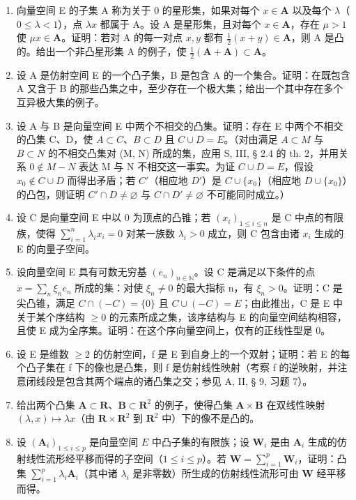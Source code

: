 \exercisegroup

\begin{enumerate}
\def\labelenumi{\arabic{enumi})}
\item
  向量空间 E 的子集 A 称为关于 0 的星形集，如果对每个 \(x \in \mathbf{A}\) 以及每个 \(\lambda\)（\(0 \leqslant \lambda < 1\)），点 \(\lambda x\) 都属于 A。设 A 是星形集，且对每个 \(x \in \mathbf{A}\)，存在 \(\mu > 1\) 使 \(\mu x \in \mathbf{A}\)。证明：若对 A 的每一对点 \(x, y\) 都有 \(\frac{1}{2}(x + y) \in \mathbf{A}\)，则 A 是凸的。给出一个非凸星形集 A 的例子，使 \(\frac{1}{2}(\mathbf{A} + \mathbf{A}) \subset \mathbf{A}\)。
\item
  设 A 是仿射空间 E 的一个凸子集，B 是包含 A 的一个集合。证明：在既包含 A 又含于 B 的那些凸集之中，至少存在一个极大集；给出一个其中存在多个互异极大集的例子。
\item
  设 A 与 B 是向量空间 E 中两个不相交的凸集。证明：存在 E 中两个不相交的凸集 C、D，使 \(A \subset C\)、\(B \subset D\) 且 \(C \cup D = E\)。（对由满足 \(A \subset M\) 与 \(B \subset N\) 的不相交凸集对 (M, N) 所成的集，应用 S, III, § 2.4 的 th. 2，并用关系 \(0 \notin M - N\) 表达 M 与 N 不相交这一事实。为证 \(C \cup D = E\)，假设 \(x_{0} \notin C \cup D\) 而得出矛盾；若 \(C'\)（相应地 \(D'\)）是 \(C \cup \{x_{0}\}\)（相应地 \(D \cup \{x_{0}\}\)）的凸包，则证明 \(C' \cap D \neq \varnothing\) 与 \(C \cap D' \neq \varnothing\) 不可能同时成立。）
\item
  设 C 是向量空间 E 中以 0 为顶点的凸锥；若 \((x_{i})_{1\leqslant i\leqslant n}\) 是 C 中点的有限族，使得 \(\sum_{i = 1}^{n}\lambda_{i}x_{i} = 0\) 对某一族数 \(\lambda_{i} > 0\) 成立，则 C 包含由诸 \(x_{i}\) 生成的 E 的向量子空间。
\item
  设向量空间 E 具有可数无穷基 \((e_{n})_{n\in\mathbb{N}}\)。设 C 是满足以下条件的点 \(x = \sum_{n} \xi_{n} e_{n}\) 所成的集：对使 \(\xi_{n} \neq 0\) 的最大指标 n，有 \(\xi_{n} > 0\)。证明：C 是尖凸锥，满足 \(C \cap (-C) = \{0\}\) 且 \(C \cup (-C) = E\)；由此推出，C 是 E 中关于某个序结构 \(\geqslant 0\) 的元素所成之集，该序结构与 E 的向量空间结构相容，且使 E 成为全序集。证明：在这个序向量空间上，仅有的正线性型是 0。
\item
  设 E 是维数 \(\geqslant 2\) 的仿射空间，f 是 E 到自身上的一个双射；证明：若 E 的每个凸子集在 f 下的像也是凸集，则 f 是仿射线性映射（考察 f 的逆映射，并注意闭线段是包含其两个端点的诸凸集之交；参见 A, II, § 9, 习题 7）。
\item
  给出两个凸集 \(\mathbf{A} \subset \mathbf{R}\)、\(\mathbf{B} \subset \mathbf{R}^2\) 的例子，使得凸集 \(\mathbf{A} \times \mathbf{B}\) 在双线性映射 \((\lambda, x) \mapsto \lambda x\)（由 \(\mathbf{R} \times \mathbf{R}^2\) 到 \(\mathbf{R}^2\) 中）下的像不是凸的。
\item
  设 \((\mathbf{A}_i)_{1 \leqslant i \leqslant p}\) 是向量空间 \(E\) 中凸子集的有限族；设 \(\mathbf{W}_i\) 是由 \(\mathbf{A}_i\) 生成的仿射线性流形经平移而得的子空间（\(1 \leqslant i \leqslant p\)）。若 \(\mathbf{W} = \sum_{i=1}^{p} \mathbf{W}_i\)，证明：凸集 \(\sum_{i=1}^{p} \lambda_i \mathbf{A}_i\)（其中诸 \(\lambda_i\) 是非零数）所生成的仿射线性流形可由 \(\mathbf{W}\) 经平移而得。
\end{enumerate}

